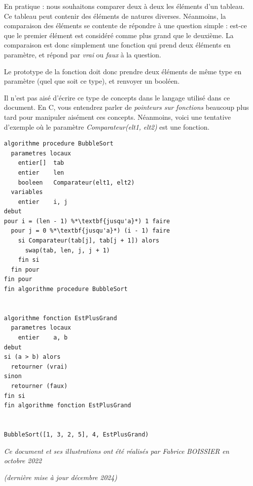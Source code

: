 \documentclass[11pt,a4paper]{article}
\begin{document}
\bigskip

En pratique : nous souhaitons comparer deux à deux les éléments d'un tableau.
Ce tableau peut contenir des éléments de natures diverses.
Néanmoins, la comparaison des éléments se contente de répondre à une question simple : est-ce que le premier élément est considéré comme plus grand que le deuxième.
La comparaison est donc simplement une fonction qui prend deux éléments en paramètre, et répond par \textit{vrai} ou \textit{faux} à la question.

Le prototype de la fonction doit donc prendre deux éléments de même type en paramètre (quel que soit ce type), et renvoyer un booléen.

\bigskip

Il n'est pas aisé d'écrire ce type de concepts dans le langage utilisé dans ce document.
En C, vous entendrez parler de \textit{pointeurs sur fonctions} beaucoup plus tard pour manipuler aisément ces concepts.
Néanmoins, voici une tentative d'exemple où le paramètre \textit{Comparateur(elt1, elt2)} est une fonction.

\clearpage

\begin{center}
\begin{lstlisting}[style=algorithmique]
algorithme procedure BubbleSort
  parametres locaux
    entier[]  tab
    entier    len
    booleen   Comparateur(elt1, elt2)
  variables
    entier    i, j
debut
pour i = (len - 1) %*\textbf{jusqu'a}*) 1 faire
  pour j = 0 %*\textbf{jusqu'a}*) (i - 1) faire
    si Comparateur(tab[j], tab[j + 1]) alors
      swap(tab, len, j, j + 1)
    fin si
  fin pour
fin pour
fin algorithme procedure BubbleSort


algorithme fonction EstPlusGrand
  parametres locaux
    entier    a, b
debut
si (a > b) alors
  retourner (vrai)
sinon
  retourner (faux)
fin si
fin algorithme fonction EstPlusGrand


BubbleSort([1, 3, 2, 5], 4, EstPlusGrand) \end{lstlisting}
\end{center}



\bigskip

\vfillFirst

\vfillLast

\begin{center}
\textit{Ce document et ses illustrations ont été réalisés par Fabrice BOISSIER en octobre 2022}

\textit{(dernière mise à jour décembre 2024)}
\end{center}
\end{document}
